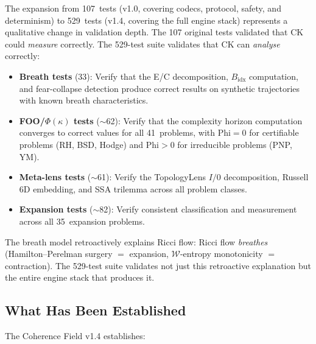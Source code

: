 \documentclass[11pt]{article}
\begin{document}
The expansion from 107~tests (v1.0, covering codecs, protocol, safety,
and determinism) to 529~tests (v1.4, covering the full engine stack)
represents a qualitative change in validation depth.  The 107 original
tests validated that CK could \emph{measure} correctly.  The 529-test
suite validates that CK can \emph{analyse} correctly:

\begin{itemize}
\item \textbf{Breath tests} (33): Verify that the E/C decomposition,
$B_{\mathrm{idx}}$ computation, and fear-collapse detection produce
correct results on synthetic trajectories with known breath
characteristics.

\item \textbf{FOO/$\Phi(\kappa)$ tests} ($\sim$62): Verify that the
complexity horizon computation converges to correct values for all
41~problems, with Phi$= 0$ for certifiable problems (RH, BSD, Hodge)
and Phi$> 0$ for irreducible problems (PNP, YM).

\item \textbf{Meta-lens tests} ($\sim$61): Verify the TopologyLens
$I/0$ decomposition, Russell 6D embedding, and SSA trilemma across
all problem classes.

\item \textbf{Expansion tests} ($\sim$82): Verify consistent
classification and measurement across all 35~expansion problems.
\end{itemize}

\noindent
The breath model retroactively explains Ricci flow: Ricci flow
\emph{breathes} (Hamilton--Perelman surgery $=$ expansion,
$\mathcal{W}$-entropy monotonicity $=$ contraction).  The 529-test
suite validates not just this retroactive explanation but the entire
engine stack that produces it.

\subsection{What Has Been Established}
\label{subsec:established}

The Coherence Field v1.4 establishes:
\end{document}
